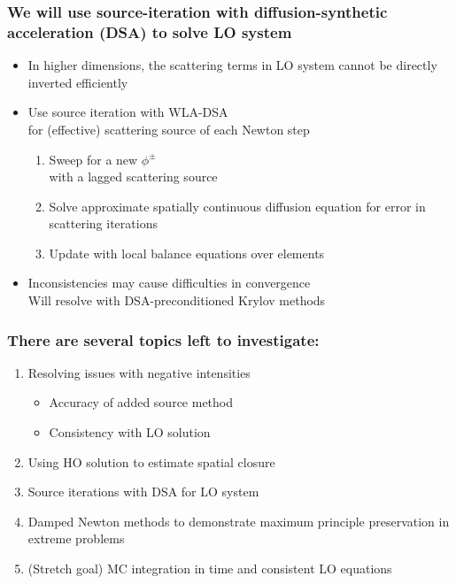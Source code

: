 \documentclass[xcolor=dvipsnames,hyperref={pdfpagelabels=false},unknownkeysallowed]{beamer}
\newcommand{\colb}[1]{{\color{blue} #1}}
\newcommand{\colG}[1]{{\color{Gray!110} #1}}
\newlength{\wideitemsep}
\let\olditem\item
\renewcommand{\item}{\setlength{\itemsep}{\wideitemsep}\olditem}
\begin{document}
\begin{frame}
    \frametitle{We will use source-iteration with diffusion-synthetic acceleration (DSA) to solve LO system}
    \begin{itemize}
        \item[] In higher dimensions, the scattering terms in LO system cannot be directly inverted efficiently
        \item[] Use source iteration with WLA-DSA \\ \colG{for (effective) scattering source
            of each Newton step}
            \begin{enumerate}
                \item Sweep for a new $\phi^{\pm}$ \\ \colG{with a lagged scattering
                    source}
                \item Solve approximate \colb{spatially continuous} diffusion equation for error in
                    scattering iterations
                \item Update with local balance equations over elements
            \end{enumerate}
        \item[] Inconsistencies may cause difficulties in convergence \\
            \colG{Will resolve with DSA-preconditioned Krylov methods}
    \end{itemize}

\end{frame}


\begin{frame}
    \frametitle{\colb{There are several topics left to investigate:}}
        \begin{enumerate}
            \item Resolving issues with negative intensities\colG{
                \begin{itemize}
                    \item Accuracy of added source method
                    \item Consistency with LO solution
                \end{itemize}}
            \item Using HO solution to estimate spatial closure
            \item Source iterations with DSA for LO system
            \item Damped Newton methods to demonstrate maximum principle preservation in
                extreme problems
            \item \colG{ (Stretch goal) MC integration in time and consistent LO equations}
        \end{enumerate}
    \end{frame}
\end{document}
